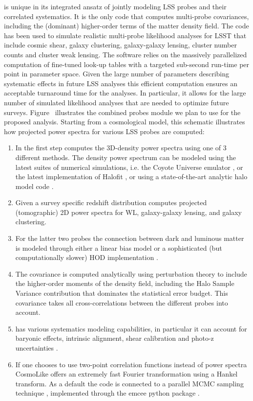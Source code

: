\CoLi is unique in its integrated ansatz of jointly modeling LSS probes and their correlated systematics. It is the only code that computes multi-probe covariances, including the (dominant) higher-order terms of the matter density field. The code has been used to simulate realistic multi-probe likelihood analyses for LSST \citep{Krause2017} that include cosmic shear, galaxy clustering, galaxy-galaxy lensing, cluster number counts and cluster weak lensing.
The software relies on the massively parallelized computation of fine-tuned look-up tables with a targeted sub-second run-time per point in parameter space. Given the large number of parameters describing systematic effects in future LSS analyses this efficient computation ensures an acceptable turnaround time for the analyses. In particular, it allows for the large number of simulated likelihood analyses that are needed to optimize future surveys. Figure~\label{fi:fcosmolike}
illustrates the \CoLi combined probes module we plan to use for the proposed analysis. Starting from a cosmological model, this schematic illustrates how projected power spectra for various LSS probes are computed:
\begin{enumerate}
\item In the first step \CoLi computes the 3D-density power spectra using one of 3 different methods. The density power spectrum can be modeled using the latest suites of numerical simulations, i.e. the Coyote Universe emulator \citep{Heitmann2014}, or the latest implementation of Halofit \citep{tsn12}, or using a state-of-the-art analytic halo model code \citep{Krause2013}.
\item Given a survey specific redshift distribution \CoLi computes projected (tomographic) 2D power spectra for WL, galaxy-galaxy lensing, and galaxy clustering.
\item  For the latter two probes the connection between dark and luminous matter is modeled through either a linear bias model or a sophisticated (but computationally slower) HOD implementation \citep{khm13}.
\item The covariance is computed analytically using perturbation theory to include the higher-order moments of the density field, including the Halo Sample Variance contribution that dominates the statistical error budget. This covariance takes all cross-correlations between the different probes into account.
\item \CoLi has various systematics modeling capabilities, in particular it can account for baryonic effects, intrinsic alignment, shear calibration and photo-z uncertainties \citep{Eifler2015, Krause2016, Krause2017}.
\item If one chooses to use two-point correlation functions instead of power spectra CosmoLike offers an extremely fast Fourier transformation using a Hankel transform. As a default the code is connected to a parallel MCMC sampling technique \citep{Goodman2010}, implemented through the emcee python package \citep{Foreman-Mackey2013}.
\end{enumerate}


